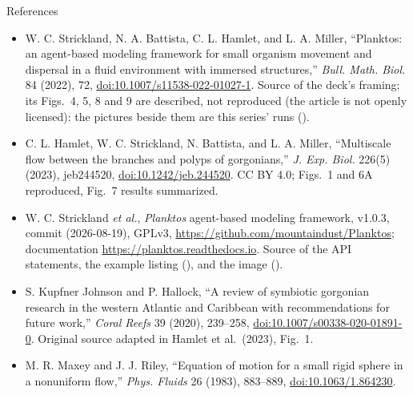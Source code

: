\documentclass[aspectratio=169,11pt]{beamer}
\begin{document}
\begin{frame}{References}
\footnotesize
\begin{itemize}\itemsep3pt
  \item W. C. Strickland, N. A. Battista, C. L. Hamlet, and L. A. Miller, ``Planktos: an agent-based modeling framework for small organism movement and dispersal in a fluid environment with immersed structures,'' \emph{Bull. Math. Biol.} 84 (2022), 72, \href{https://doi.org/10.1007/s11538-022-01027-1}{doi:10.1007/s11538-022-01027-1}. Source of the deck's framing; its Figs.~4, 5, 8 and 9 are described, not reproduced (the article is not openly licensed): the pictures beside them are this series' runs ().
  \item C. L. Hamlet, W. C. Strickland, N. Battista, and L. A. Miller, ``Multiscale flow between the branches and polyps of gorgonians,'' \emph{J. Exp. Biol.} 226(5) (2023), jeb244520, \href{https://doi.org/10.1242/jeb.244520}{doi:10.1242/jeb.244520}. CC BY 4.0; Figs.~1 and 6A reproduced, Fig.~7 results summarized.
  \item W. C. Strickland \emph{et al.}, \emph{Planktos} agent-based modeling framework, v1.0.3, commit  (2026-08-19), GPLv3, \url{https://github.com/mountaindust/Planktos}; documentation \url{https://planktos.readthedocs.io}. Source of the API statements, the example listing (), and the  image ().
  \item S. Kupfner Johnson and P. Hallock, ``A review of symbiotic gorgonian research in the western Atlantic and Caribbean with recommendations for future work,'' \emph{Coral Reefs} 39 (2020), 239--258, \href{https://doi.org/10.1007/s00338-020-01891-0}{doi:10.1007/s00338-020-01891-0}. Original source adapted in Hamlet et al.\ (2023), Fig.~1.
  \item M. R. Maxey and J. J. Riley, ``Equation of motion for a small rigid sphere in a nonuniform flow,'' \emph{Phys. Fluids} 26 (1983), 883--889, \href{https://doi.org/10.1063/1.864230}{doi:10.1063/1.864230}.
\end{itemize}
\end{frame}
\end{document}
